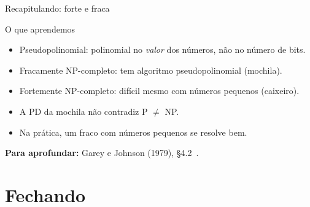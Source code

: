 \documentclass[aspectratio=169,xcolor=table]{beamer}
\newcommand{\fonte}[1]{%
  \vfill
  {\tiny\color{gray!55!black}\textbf{Para aprofundar:} #1\par}%
}
\begin{document}
\begin{frame}{Recapitulando: forte e fraca}
  \begin{block}{O que aprendemos}
    \begin{itemize}
      \item Pseudopolinomial: polinomial no \emph{valor} dos números, não no número de bits.
      \item Fracamente NP-completo: tem algoritmo pseudopolinomial (mochila).
      \item Fortemente NP-completo: difícil mesmo com números pequenos (caixeiro).
      \item A PD da mochila não contradiz P $\ne$ NP.
      \item Na prática, um fraco com números pequenos se resolve bem.
    \end{itemize}
  \end{block}
  \fonte{Garey e Johnson (1979), \S 4.2~\cite{garey1979computers}.}
\end{frame}

\section*{Fechando}
\end{document}
